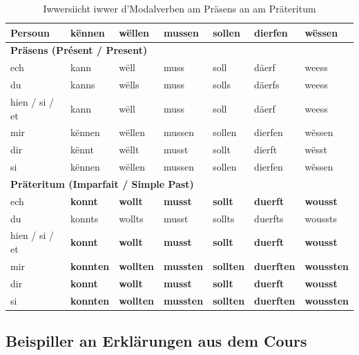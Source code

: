 \begin{table}[htbp]
    \centering
    \begin{tabular}{lllllll}
        \toprule
        \textbf{Persoun} & \textbf{kënnen} & \textbf{wëllen} & \textbf{mussen} & \textbf{sollen} & \textbf{dierfen} & \textbf{wëssen} \\
        \midrule
        \multicolumn{7}{l}{\textbf{Präsens (Présent / Present)}} \\
        \midrule
        ech & kann & wëll & muss & soll & däerf & weess \\
        du & kanns & wëlls & muss & solls & däerfs & weess \\
        hien / si / et & kann & wëll & muss & soll & däerf & weess \\
        mir & kënnen & wëllen & mussen & sollen & dierfen & wëssen \\
        dir & kënnt & wëllt & musst & sollt & dierft & wësst \\
        si & kënnen & wëllen & mussen & sollen & dierfen & wëssen \\
        \midrule
        \multicolumn{7}{l}{\textbf{Präteritum (Imparfait / Simple Past)}} \\
        \midrule
        ech & \textbf{konnt} & \textbf{wollt} & \textbf{musst} & \textbf{sollt} & \textbf{duerft} & \textbf{wousst} \\
        du & konnts & wollts & musst & sollts & duerfts & woussts \\
        hien / si / et & \textbf{konnt} & \textbf{wollt} & \textbf{musst} & \textbf{sollt} & \textbf{duerft} & \textbf{wousst} \\
        mir & \textbf{konnten} & \textbf{wollten} & \textbf{mussten} & \textbf{sollten} & \textbf{duerften} & \textbf{woussten} \\
        dir & \textbf{konnt} & \textbf{wollt} & \textbf{musst} & \textbf{sollt} & \textbf{duerft} & \textbf{wousst} \\
        si & \textbf{konnten} & \textbf{wollten} & \textbf{mussten} & \textbf{sollten} & \textbf{duerften} & \textbf{woussten} \\
        \bottomrule
    \end{tabular}
    \caption{Iwwersiicht iwwer d'Modalverben am Präsens an am Präteritum}
\end{table}

\subsection{Beispiller an Erklärungen aus dem Cours}

